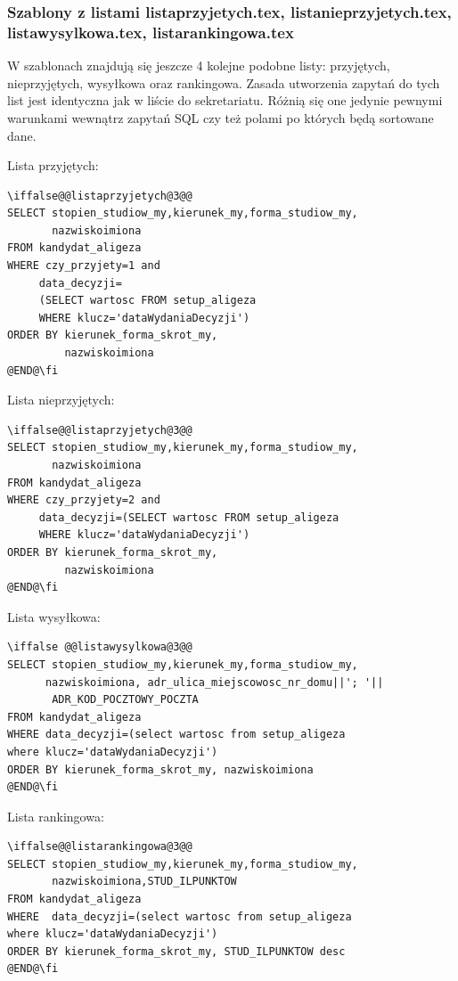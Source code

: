 \subsubsection*{Szablony z listami listaprzyjetych.tex, listanieprzyjetych.tex, listawysylkowa.tex, listarankingowa.tex}
W szablonach znajdują się jeszcze 4 kolejne podobne listy: przyjętych, nieprzyjętych, wysyłkowa oraz rankingowa. Zasada utworzenia zapytań do tych list jest identyczna jak w liście do sekretariatu. Różnią się one jedynie pewnymi warunkami wewnątrz zapytań SQL czy też polami po których będą sortowane dane.

\par Lista przyjętych:
 \begin{lstlisting}
\iffalse@@listaprzyjetych@3@@
SELECT stopien_studiow_my,kierunek_my,forma_studiow_my,
       nazwiskoimiona 
FROM kandydat_aligeza 
WHERE czy_przyjety=1 and
     data_decyzji=
     (SELECT wartosc FROM setup_aligeza 
     WHERE klucz='dataWydaniaDecyzji')
ORDER BY kierunek_forma_skrot_my,
         nazwiskoimiona
@END@\fi
\end{lstlisting}
\par Lista nieprzyjętych:
 \begin{lstlisting}
\iffalse@@listaprzyjetych@3@@
SELECT stopien_studiow_my,kierunek_my,forma_studiow_my,
       nazwiskoimiona 
FROM kandydat_aligeza 
WHERE czy_przyjety=2 and
     data_decyzji=(SELECT wartosc FROM setup_aligeza 
     WHERE klucz='dataWydaniaDecyzji')
ORDER BY kierunek_forma_skrot_my,
         nazwiskoimiona
@END@\fi
\end{lstlisting}
\par Lista wysyłkowa:
 \begin{lstlisting}
\iffalse @@listawysylkowa@3@@
SELECT stopien_studiow_my,kierunek_my,forma_studiow_my,
      nazwiskoimiona, adr_ulica_miejscowosc_nr_domu||'; '||
       ADR_KOD_POCZTOWY_POCZTA
FROM kandydat_aligeza 
WHERE data_decyzji=(select wartosc from setup_aligeza 
where klucz='dataWydaniaDecyzji')
ORDER BY kierunek_forma_skrot_my, nazwiskoimiona
@END@\fi
\end{lstlisting}
\par Lista rankingowa:
 \begin{lstlisting}
\iffalse@@listarankingowa@3@@
SELECT stopien_studiow_my,kierunek_my,forma_studiow_my,
       nazwiskoimiona,STUD_ILPUNKTOW
FROM kandydat_aligeza
WHERE  data_decyzji=(select wartosc from setup_aligeza 
where klucz='dataWydaniaDecyzji')
ORDER BY kierunek_forma_skrot_my, STUD_ILPUNKTOW desc
@END@\fi
\end{lstlisting}
\par 
